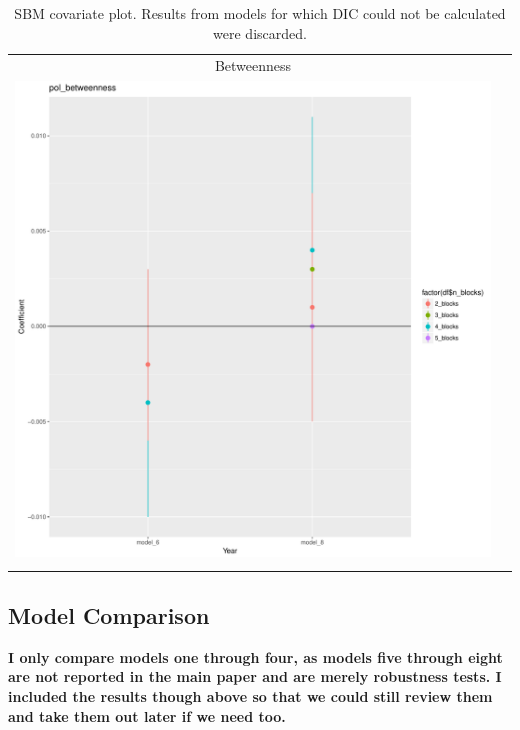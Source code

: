 \documentclass[fleqn,12pt]{wlscirep}
\begin{document}
\clearpage
\begin{longtable}[!h]{c@{\hskip 0cm}c}
Betweenness \\
\includegraphics[height=.75\textheight, clip=true, trim=.5cm .5cm 0cm .6cm]{figures/rl_plots2/pol_betweenness.pdf}   \\
\caption{\label{fig:SBM_plot_between} SBM covariate plot. Results from models for which DIC could not be calculated were discarded.}
\end{longtable}



\subsection{Model Comparison}

\textbf{I only compare models one through four, as models five through eight are not reported in the main paper and are merely robustness tests. I included the results though above so that we could still review them and take them out later if we need too.}
\end{document}
